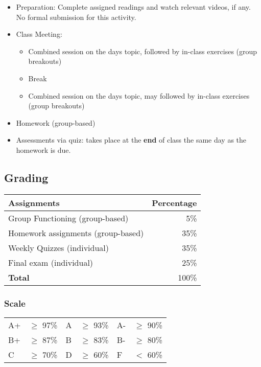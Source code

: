 \documentclass[11pt]{article}
\begin{document}
\begin{itemize}
\item
  Preparation: Complete assigned readings and watch relevant videos, if
  any. No formal submission for this activity.
\item
  Class Meeting:

  \begin{itemize}
  \item
    Combined session on the day\textquotesingle s topic, followed by
    in-class exercises (group breakouts)
  \item
    Break
  \item
    Combined session on the day\textquotesingle s topic, may followed by
    in-class exercises (group breakouts)
  \end{itemize}
\item
  Homework (group-based)
\item
  Assessments via quiz: takes place at the \textbf{end} of class the
  same day as the homework is due.
\end{itemize}

\subsection{Grading}\label{grading}

\begin{tabular}{lr}
\textbf{Assignments} & \textbf{Percentage} \\
\hline
Group Functioning (group-based) & 5\% \\
Homework assignments (group-based) & 35\% \\
Weekly Quizzes (individual) & 35\% \\
  Final exam (individual) & 25\% \\
  \hline
    \textbf{Total} & 100\% \\
\end{tabular}

\subsubsection{Scale}\label{scale}

\begin{tabular}{llllll}
A+ & $\ge$ 97\% & A & $\ge$  93\% & A- & $\ge$
90\% \\
B+ & $\ge$  87\% & B & $\ge$  83\% & B- & $\ge$
80\% \\
C & $\ge$  70\% & D & $\ge$  60\% & F & $<$
60\% \\
\end{tabular}
\end{document}
